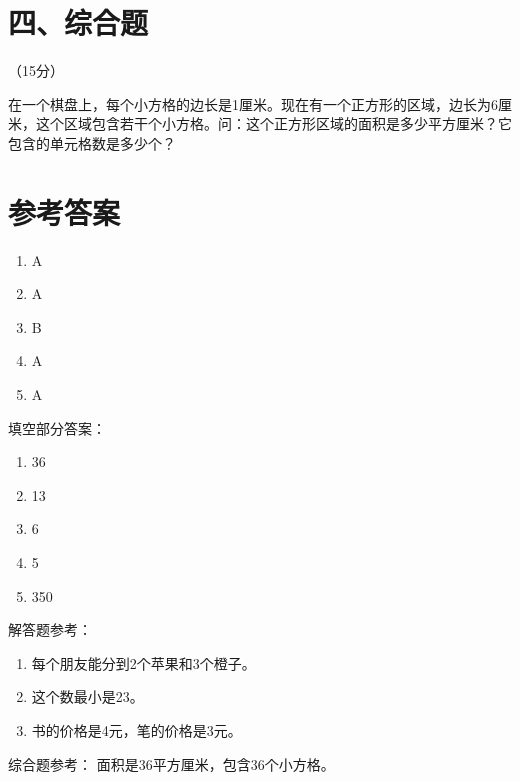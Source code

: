 \documentclass{article}
\begin{document}
\section*{四、综合题}（15分）

在一个棋盘上，每个小方格的边长是1厘米。现在有一个正方形的区域，边长为6厘米，这个区域包含若干个小方格。问：这个正方形区域的面积是多少平方厘米？它包含的单元格数是多少个？

\section*{参考答案}

\begin{enumerate}
    \item A
    \item A
    \item B
    \item A
    \item A
\end{enumerate}

填空部分答案：
\begin{enumerate}
    \item 36
    \item 13
    \item 6
    \item 5
    \item 350
\end{enumerate}

解答题参考：
\begin{enumerate}
    \item 每个朋友能分到2个苹果和3个橙子。
    \item 这个数最小是23。
    \item 书的价格是4元，笔的价格是3元。
\end{enumerate}

综合题参考：
面积是36平方厘米，包含36个小方格。
\end{document}
